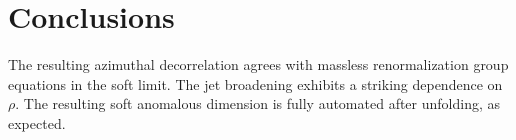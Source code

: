 \section{Conclusions}\label{sec:conclusions}

The resulting azimuthal decorrelation agrees with massless
renormalization group equations in the soft limit. The jet broadening
exhibits a striking dependence on $\rho$. The resulting soft anomalous
dimension is fully automated after unfolding, as expected.

